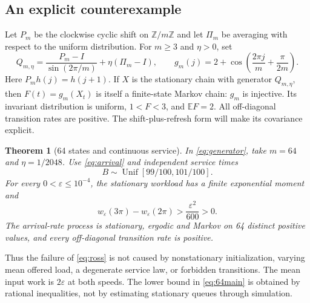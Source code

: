 \documentclass[11pt,reqno]{amsart}
\numberwithin{equation}{section}
\theoremstyle{plain}
\newtheorem{theorem}{Theorem}[section]
\theoremstyle{definition}
\newcommand{\E}{\mathbb E}
\newcommand{\Z}{\mathbb Z}
\newcommand{\1}{\mathbf 1}
\newcommand{\eps}{\varepsilon}
\DeclareMathOperator{\Unif}{Unif}
\begin{document}
\subsection{An explicit counterexample}
Let $P_m$ be the clockwise cyclic shift on $\Z/m\Z$ and let $\Pi_m$ be averaging with respect to the uniform distribution. For $m\ge3$ and $\eta>0$, set
\begin{equation}\label{eq:generator}
 Q_{m,\eta}=\frac{P_m-I}{\sin(2\pi/m)}+\eta(\Pi_m-I),
 \qquad
 g_m(j)=2+\cos\left(\frac{2\pi j}{m}+\frac{\pi}{2m}\right).
\end{equation}
Here $P_mh(j)=h(j+1)$. If $X$ is the stationary chain with generator $Q_{m,\eta}$, then $F(t)=g_m(X_t)$ is itself a finite-state Markov chain: $g_m$ is injective. Its invariant distribution is uniform, $1<F<3$, and $\E F=2$. All off-diagonal transition rates are positive. The shift-plus-refresh form will make its covariance explicit.

\begin{theorem}[64 states and continuous service]\label{thm:64}
In \eqref{eq:generator}, take $m=64$ and $\eta=1/2048$. Use \eqref{eq:arrival} and independent service times
\begin{equation}\label{eq:uniformservice}
 B\sim\Unif[99/100,101/100].
\end{equation}
For every $0<\eps\le10^{-4}$, the stationary workload has a finite exponential moment and
\begin{equation}\label{eq:64main}
 w_\eps(3\pi)-w_\eps(2\pi)>\frac{\eps^2}{600}>0.
\end{equation}
The arrival-rate process is stationary, ergodic and Markov on 64 distinct positive values, and every off-diagonal transition rate is positive.
\end{theorem}

Thus the failure of \eqref{eq:ross} is not caused by nonstationary initialization, varying mean offered load, a degenerate service law, or forbidden transitions. The mean input work is $2\eps$ at both speeds. The lower bound in \eqref{eq:64main} is obtained by rational inequalities, not by estimating stationary queues through simulation.
\end{document}
